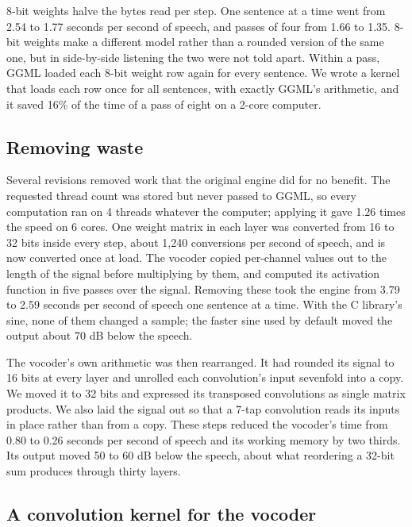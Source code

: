 \documentclass[11pt]{article}
\begin{document}
8-bit weights halve the bytes read per step. One sentence at a time went
from 2.54 to 1.77 seconds per second of speech, and passes of four from
1.66 to 1.35. 8-bit weights make a different model rather than a rounded
version of the same one, but in side-by-side listening the two were not
told apart. Within a pass, GGML loaded each 8-bit weight row again for
every sentence. We wrote a kernel that loads each row once for all
sentences, with exactly GGML's arithmetic, and it saved 16\% of the time
of a pass of eight on a 2-core computer.

\hypertarget{removing-waste}{%
\subsection{Removing waste}\label{removing-waste}}

Several revisions removed work that the original engine did for no
benefit. The requested thread count was stored but never passed to GGML,
so every computation ran on 4 threads whatever the computer; applying it
gave 1.26 times the speed on 6 cores. One weight matrix in each layer
was converted from 16 to 32 bits inside every step, about 1,240
conversions per second of speech, and is now converted once at load. The
vocoder copied per-channel values out to the length of the signal before
multiplying by them, and computed its activation function in five passes
over the signal. Removing these took the engine from 3.79 to 2.59
seconds per second of speech one sentence at a time. With the C
library's sine, none of them changed a sample; the faster sine used by
default moved the output about 70 dB below the speech.

The vocoder's own arithmetic was then rearranged. It had rounded its
signal to 16 bits at every layer and unrolled each convolution's input
sevenfold into a copy. We moved it to 32 bits and expressed its
transposed convolutions as single matrix products. We also laid the
signal out so that a 7-tap convolution reads its inputs in place rather
than from a copy. These steps reduced the vocoder's time from 0.80 to
0.26 seconds per second of speech and its working memory by two thirds.
Its output moved 50 to 60 dB below the speech, about what reordering a
32-bit sum produces through thirty layers.

\hypertarget{a-convolution-kernel-for-the-vocoder}{%
\subsection{A convolution kernel for the
vocoder}\label{a-convolution-kernel-for-the-vocoder}}
\end{document}
